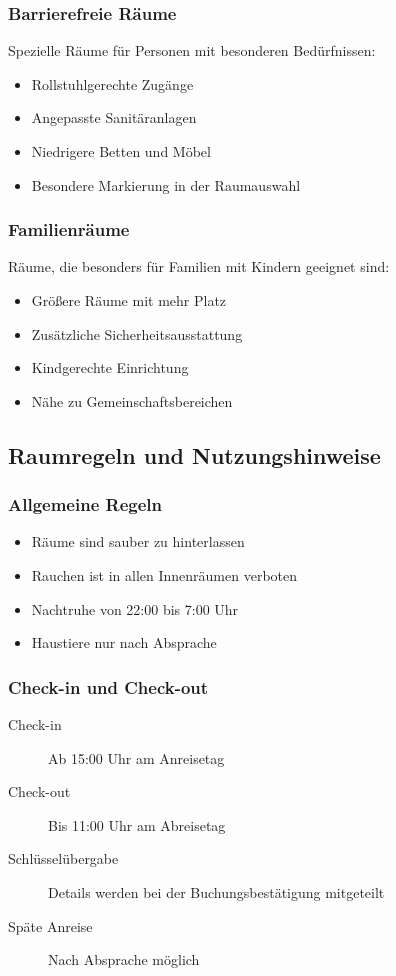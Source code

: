 \subsubsection{Barrierefreie Räume}

Spezielle Räume für Personen mit besonderen Bedürfnissen:

\begin{itemize}
    \item Rollstuhlgerechte Zugänge
    \item Angepasste Sanitäranlagen
    \item Niedrigere Betten und Möbel
    \item Besondere Markierung in der Raumauswahl
\end{itemize}

\subsubsection{Familienräume}

Räume, die besonders für Familien mit Kindern geeignet sind:

\begin{itemize}
    \item Größere Räume mit mehr Platz
    \item Zusätzliche Sicherheitsausstattung
    \item Kindgerechte Einrichtung
    \item Nähe zu Gemeinschaftsbereichen
\end{itemize}

\subsection{Raumregeln und Nutzungshinweise}

\subsubsection{Allgemeine Regeln}

\begin{itemize}
    \item Räume sind sauber zu hinterlassen
    \item Rauchen ist in allen Innenräumen verboten
    \item Nachtruhe von 22:00 bis 7:00 Uhr
    \item Haustiere nur nach Absprache
\end{itemize}

\subsubsection{Check-in und Check-out}

\begin{description}
    \item[Check-in] Ab 15:00 Uhr am Anreisetag
    \item[Check-out] Bis 11:00 Uhr am Abreisetag
    \item[Schlüsselübergabe] Details werden bei der Buchungsbestätigung mitgeteilt
    \item[Späte Anreise] Nach Absprache möglich
\end{description}

\newpage